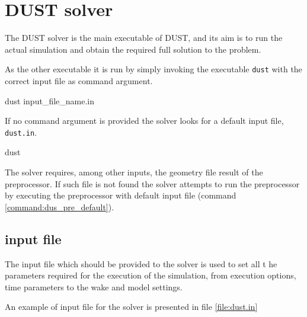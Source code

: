 \chapter{DUST solver}

The DUST solver is the main executable of DUST, and its aim is to run 
the actual simulation and obtain the required full solution to the problem. 

As the other executable it is run by simply invoking the executable \texttt{dust} with the correct input file as command argument.
\begin{command}[caption={Solver command looking for input file 
    \texttt{input\_file\_name.in}}]
    dust input_file_name.in
\end{command}

If no command argument is provided the solver looks for a default input file, \texttt{dust.in}. 
\begin{command}[caption={Solver command looking for 
default input file \texttt{dust.in}}]
    dust
\end{command}

The solver requires, among other inputs, the geometry file result of the preprocessor. 
If such file is not found the solver attempts to run the preprocessor by executing 
the preprocessor with default input file (command \ref{command:dus_pre_default}). 

\section{input file}
\label{sec:Solver_InputFile}

The input file which should be provided to the solver is used to set all t
he parameters required for the execution of the simulation, 
from execution options, time parameters to the wake and model 
settings. 

An example of input file for the solver is presented in file \ref{file:dust.in}

